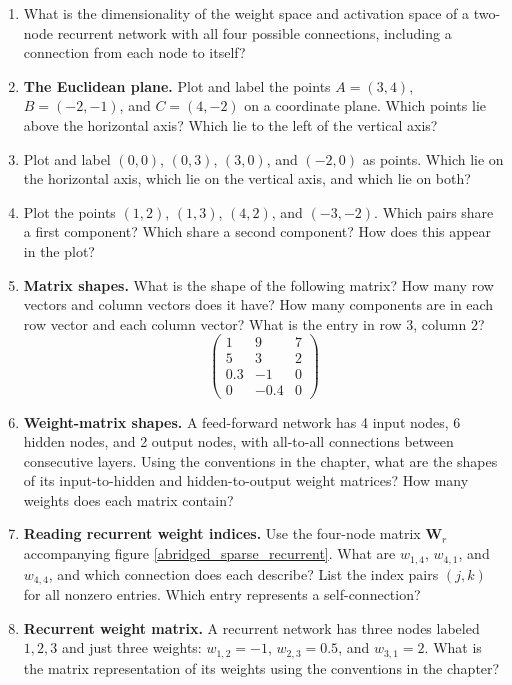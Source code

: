 \begin{enumerate}
\item What is the dimensionality of the weight space and activation space of a two-node recurrent network with all four possible connections, including a connection from each node to itself?

\item \textbf{The Euclidean plane.} Plot and label the points $A=(3,4)$, $B=(-2,-1)$, and $C=(4,-2)$ on a coordinate plane. Which points lie above the horizontal axis? Which lie to the left of the vertical axis?

\item Plot and label $(0,0)$, $(0,3)$, $(3,0)$, and $(-2,0)$ as points. Which lie on the horizontal axis, which lie on the vertical axis, and which lie on both?

\item Plot the points $(1,2)$, $(1,3)$, $(4,2)$, and $(-3,-2)$. Which pairs share a first component? Which share a second component? How does this appear in the plot?

\item \textbf{Matrix shapes.} What is the shape of the following matrix? How many row vectors and column vectors does it have? How many components are in each row vector and each column vector? What is the entry in row $3$, column $2$?
\[
\begin{pmatrix}
1&9&7\\5&3&2\\0.3&-1&0\\0&-0.4&0
\end{pmatrix}
\]

\item \textbf{Weight-matrix shapes.} A feed-forward network has 4 input nodes, 6 hidden nodes, and 2 output nodes, with all-to-all connections between consecutive layers. Using the conventions in the chapter, what are the shapes of its input-to-hidden and hidden-to-output weight matrices? How many weights does each matrix contain?

\item \textbf{Reading recurrent weight indices.} Use the four-node matrix $\mathbf{W}_r$ accompanying figure \ref{abridged_sparse_recurrent}. What are $w_{1,4}$, $w_{4,1}$, and $w_{4,4}$, and which connection does each describe? List the index pairs $(j,k)$ for all nonzero entries. Which entry represents a self-connection?

\item \textbf{Recurrent weight matrix.}\label{abridged_ex_recurrent} A recurrent network has three nodes labeled $1,2,3$ and just three weights: $w_{1,2}=-1$, $w_{2,3}=0.5$, and $w_{3,1}=2$. What is the matrix representation of its weights using the conventions in the chapter?


\end{enumerate}
